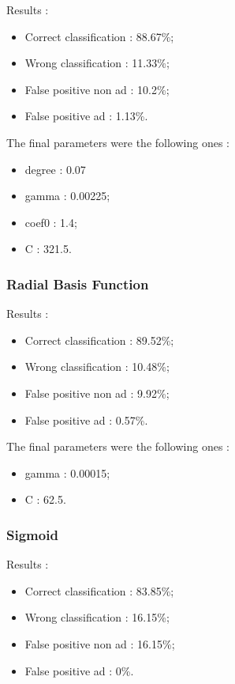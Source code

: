 Results :
\begin{itemize}
  \item Correct classification : 88.67\%;
  \item Wrong classification : 11.33\%;
  \item False positive non ad : 10.2\%;
  \item False positive ad : 1.13\%.
\end{itemize}

The final parameters were the following ones :
\begin{itemize}
  \item degree : 0.07
  \item gamma : 0.00225;
  \item coef0 : 1.4;
  \item C : 321.5.
\end{itemize}


\subsubsection{Radial Basis Function}


Results :
\begin{itemize}
  \item Correct classification : 89.52\%;
  \item Wrong classification : 10.48\%;
  \item False positive non ad : 9.92\%;
  \item False positive ad : 0.57\%.
\end{itemize}

The final parameters were the following ones :
\begin{itemize}
  \item gamma : 0.00015;
  \item C : 62.5.
\end{itemize}

\subsubsection{Sigmoid}

Results :
\begin{itemize}
  \item Correct classification : 83.85\%;
  \item Wrong classification : 16.15\%;
  \item False positive non ad : 16.15\%;
  \item False positive ad : 0\%.
\end{itemize}


